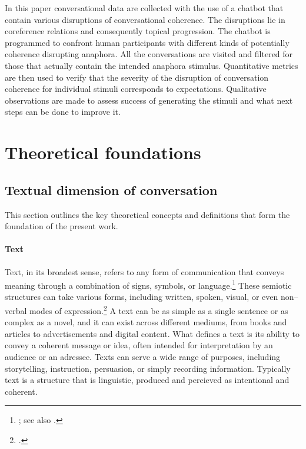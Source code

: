 \documentclass[12pt]{report}
\begin{document}
{In this paper conversational data are collected
with the use of a chatbot
that contain various disruptions of conversational coherence.
The disruptions lie in coreference relations and consequently topical progression.
The chatbot is programmed to confront human participants with
different kinds of potentially coherence disrupting anaphora.
All the conversations are visited and filtered for those
that actually contain the intended anaphora stimulus.
Quantitative metrics are then used to verify that
the severity of the disruption of conversation coherence for individual stimuli corresponds to expectations.
Qualitative observations are made to assess
success of generating the stimuli and what next steps can be done to improve it.




\chapter{Theoretical foundations}


\section{Textual dimension of conversation}
\par
    This section outlines the key theoretical concepts and definitions
    that form the foundation of the present work.


\subsubsection{Text}
\par
    Text, in its broadest sense, refers to any form of communication that conveys meaning through a combination of signs, symbols, or language.\footnote{\cite[p.~7]{hrbacek1994}; see also \cite{hjelmslev2016}.}
    These semiotic structures can take various forms, including written, spoken, visual, or even non–verbal modes of expression.\footcite[p.~13]{barthes1977image}
    A text can be as simple as a single sentence or as complex as a novel, and it can exist across different mediums, from books and articles to advertisements and digital content.
    What defines a text is its ability to convey a coherent message or idea, often intended for interpretation by an audience or an adressee.
    Texts can serve a wide range of purposes, including storytelling, instruction, persuasion, or simply recording information.
    Typically text is a structure that is
    linguistic, produced and percieved as intentional and coherent.

}
\end{document}

